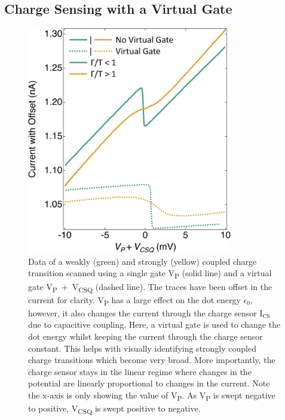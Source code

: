\subsection{Charge Sensing with a Virtual Gate}

\begin{figure}[!htb]
 \begin{center}
  \includegraphics[width=0.8\textwidth]{figures/ch1/crop_FiguresMaster.012.png}
  \caption[Measuring charge transitions with and without a virtual gate]{\label{fig:ch1/virtual_gate_example} 
  Data of a weakly (green) and strongly (yellow) coupled charge transition scanned using a single gate V\textsubscript{P} (solid line) and a virtual gate V\textsubscript{P}~+~V\textsubscript{CSQ} (dashed line). The traces have been offset in the current for clarity. V\textsubscript{P} has a large effect on the dot energy $\epsilon_0$, however, it also changes the current through the charge sensor $\mathrm{I_{CS}}$ due to capacitive coupling. Here, a virtual gate is used to change the dot energy whilst keeping the current through the charge sensor constant. This helps with visually identifying strongly coupled charge transitions which become very broad. More importantly, the charge sensor stays in the linear regime where changes in the potential are linearly proportional to changes in the current. Note the x-axis is only showing the value of V\textsubscript{P}. As V\textsubscript{P} is swept negative to positive, V\textsubscript{CSQ} is swept positive to negative.}
 \end{center}
\end{figure}


